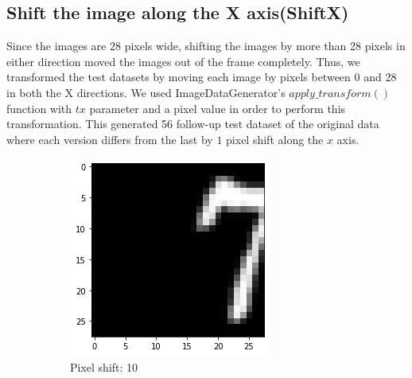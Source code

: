 \subsection{Shift the image along the X axis(ShiftX)}
Since the images are $28$ pixels wide, shifting the images by more than 28 pixels in either direction moved the images out of the frame completely. Thus, we transformed the test datasets by moving each image by pixels between 0 and 28 in both the X directions. We used ImageDataGenerator's $apply\_transform()$ function with $tx$ parameter and a pixel value in order to perform this transformation. This generated 56 follow-up test dataset of the original data where each version differs from the last by $1$ pixel shift along the $x$ axis.
    \begin{figure}[htb!]
        \centering
        \begin{subfigure}[b]{.3\textwidth}
            \centering
            \includegraphics[width=\linewidth]{images/shiftx1.png}
            \caption{Pixel shift: 10}
            \label{fig:Rotate-misclass0}
        \end{subfigure}%
        \begin{subfigure}[b]{.3\textwidth}
            \centering

\end{subfigure}
\end{figure}
